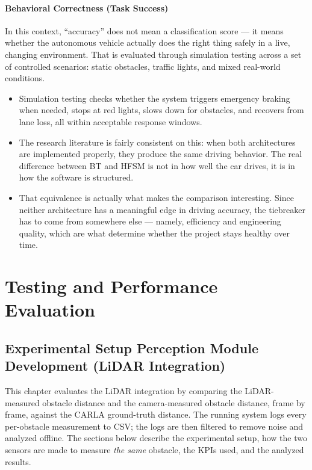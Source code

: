 \documentclass[12pt, a4paper]{report}
\begin{document}
\subsubsection{Behavioral Correctness (Task Success)}

In this context, ``accuracy'' does not mean a classification score --- it means whether the autonomous vehicle actually does the right thing safely in a live, changing environment. That is evaluated through simulation testing across a set of controlled scenarios: static obstacles, traffic lights, and mixed real-world conditions.

\begin{itemize}
    \item Simulation testing checks whether the system triggers emergency braking when needed, stops at red lights, slows down for obstacles, and recovers from lane loss, all within acceptable response windows.
    \item The research literature is fairly consistent on this: when both architectures are implemented properly, they produce the same driving behavior. The real difference between BT and HFSM is not in how well the car drives, it is in how the software is structured.
    \item That equivalence is actually what makes the comparison interesting. Since neither architecture has a meaningful edge in driving accuracy, the tiebreaker has to come from somewhere else --- namely, efficiency and engineering quality, which are what determine whether the project stays healthy over time.
\end{itemize}


\chapter{ Testing and Performance Evaluation}

\section{Experimental Setup Perception Module Development (LiDAR Integration)}

This chapter evaluates the LiDAR integration by comparing the LiDAR-measured
obstacle distance and the camera-measured obstacle distance, frame by frame,
against the CARLA ground-truth distance. The running system logs every
per-obstacle measurement to CSV; the logs are then filtered to remove noise and
analyzed offline. The sections below describe the experimental setup, how the
two sensors are made to measure \emph{the same} obstacle, the KPIs used, and the
analyzed results.
\end{document}
